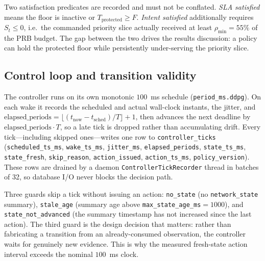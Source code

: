 Two satisfaction predicates are recorded and must not be conflated. \emph{SLA satisfied} means the floor is inactive or $T_{\mathrm{protected}}\geq F$. \emph{Intent satisfied} additionally requires $S_t\leq0$, i.e.\ the commanded priority slice actually received at least $\rho_{\min}=55\%$ of the PRB budget. The gap between the two drives the results discussion: a policy can hold the protected floor while persistently under-serving the priority slice.

\subsection{Control loop and transition validity}
\label{subsec:ctl-loop}
The controller runs on its own monotonic $100$~ms schedule (\texttt{period\_ms.ddpg}). On each wake it records the scheduled and actual wall-clock instants, the jitter, and $\mathrm{elapsed\_periods}=\lfloor(t_{\mathrm{now}}-t_{\mathrm{sched}})/T\rfloor+1$, then advances the next deadline by $\mathrm{elapsed\_periods}\cdot T$, so a late tick is dropped rather than accumulating drift. Every tick---including skipped ones---writes one row to \texttt{controller\_ticks} (\texttt{scheduled\_ts\_ms}, \texttt{wake\_ts\_ms}, \texttt{jitter\_ms}, \texttt{elapsed\_periods}, \texttt{state\_ts\_ms}, \texttt{state\_fresh}, \texttt{skip\_reason}, \texttt{action\_issued}, \texttt{action\_ts\_ms}, \texttt{policy\_version}). These rows are drained by a daemon \texttt{ControllerTickRecorder} thread in batches of 32, so database I/O never blocks the decision path.

Three guards skip a tick without issuing an action: \texttt{no\_state} (no \texttt{network\_state} summary), \texttt{stale\_age} (summary age above \texttt{max\_state\_age\_ms}${}=1000$), and \texttt{state\_not\_advanced} (the summary timestamp has not increased since the last action). The third guard is the design decision that matters: rather than fabricating a transition from an already-consumed observation, the controller waits for genuinely new evidence. This is why the measured fresh-state action interval exceeds the nominal $100$~ms clock.


